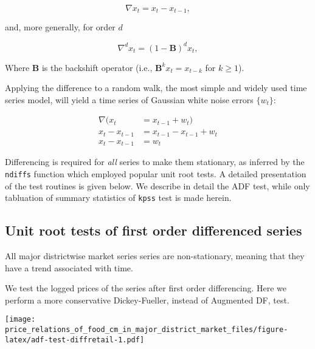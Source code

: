 \documentclass[12pt,]{article}
\begin{document}
\begin{equation}
\nabla x_t = x_t - x_{t-1},
\label{eqn:difference-operator}
\end{equation}

and, more generally, for order \(d\)

\begin{equation}
\nabla^d x_t = (1-\mathbf{B})^d x_t,
\label{eqn:order-d-difference-operator}
\end{equation}

Where \(\mathbf{B}\) is the backshift operator (i.e., \(\mathbf{B}^k x_t = x_{t-k}\) for \(k \geq 1\)).

Applying the difference to a random walk, the most simple and widely used time series model, will yield a time series of Gaussian white noise errors \(\{w_t\}\):

\begin{equation}
  \begin{aligned}
    \nabla (x_t &= x_{t-1} + w_t) \\
    x_t - x_{t-1} &= x_{t-1} - x_{t-1} + w_t \\
    x_t - x_{t-1} &= w_t
  \end{aligned}
  \label{eqn:random-walk-series}
\end{equation}

Differencing is required for \emph{all} series to make them stationary, as inferred by the \texttt{ndiffs} function which employed popular unit root tests. A detailed presentation of the test routines is given below. We describe in detail the ADF test, while only tabluation of summary statistics of \texttt{kpss} test is made herein.

\hypertarget{unit-root-tests-of-first-order-differenced-series}{%
\subsection{Unit root tests of first order differenced series}\label{unit-root-tests-of-first-order-differenced-series}}

All major districtwise market series series are non-stationary, meaning that they have a trend associated with time.

We test the logged prices of the series after first order differencing. Here we perform a more conservative Dickey-Fueller, instead of Augmented DF, test.

\texttt{[image: price\_relations\_of\_food\_cm\_in\_major\_district\_market\_files/figure-latex/adf-test-diffretail-1.pdf]}
\end{document}
